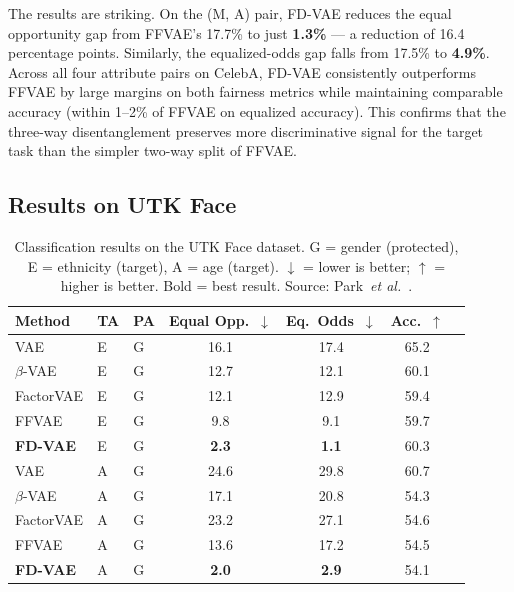 The results are striking. On the (M, A) pair, FD-VAE reduces the equal opportunity gap from
FFVAE's 17.7\% to just \textbf{1.3\%} --- a reduction of 16.4 percentage points. Similarly, the
equalized-odds gap falls from 17.5\% to \textbf{4.9\%}. Across all four attribute pairs on CelebA,
FD-VAE consistently outperforms FFVAE by large margins on both fairness metrics while maintaining
comparable accuracy (within 1--2\% of FFVAE on equalized accuracy). This confirms that the
three-way disentanglement preserves more discriminative signal for the target task than the simpler
two-way split of FFVAE.

\subsection{Results on UTK Face}

\begin{table}[htbp]
    \centering
    \caption{%
        Classification results on the UTK Face dataset. G = gender (protected),
        E = ethnicity (target), A = age (target).
        $\downarrow$ = lower is better; $\uparrow$ = higher is better.
        Bold = best result. Source: Park~\emph{et al.}~\cite{park2020readme}.
    }
    \label{tab:utk-results}
    \small
    \setlength{\tabcolsep}{5pt}
    \begin{tabular}{lllcccc}
        \toprule
        \textbf{Method} & \textbf{TA} & \textbf{PA} &
        \textbf{Equal Opp.~$\downarrow$} & \textbf{Eq.\ Odds~$\downarrow$} &
        \textbf{Acc.~$\uparrow$} \\
        \midrule
        VAE         & E & G & 16.1 & 17.4 & 65.2 \\
        $\beta$-VAE & E & G & 12.7 & 12.1 & 60.1 \\
        FactorVAE   & E & G & 12.1 & 12.9 & 59.4 \\
        FFVAE       & E & G &  9.8 &  9.1 & 59.7 \\
        \textbf{FD-VAE} & E & G & \textbf{2.3} & \textbf{1.1} & 60.3 \\
        \midrule
        VAE         & A & G & 24.6 & 29.8 & 60.7 \\
        $\beta$-VAE & A & G & 17.1 & 20.8 & 54.3 \\
        FactorVAE   & A & G & 23.2 & 27.1 & 54.6 \\
        FFVAE       & A & G & 13.6 & 17.2 & 54.5 \\
        \textbf{FD-VAE} & A & G & \textbf{2.0} & \textbf{2.9} & 54.1 \\
        \bottomrule
    \end{tabular}
\end{table}

